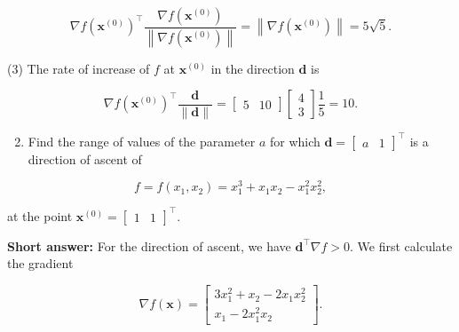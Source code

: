 \begin{equation*}
	\nabla f\left(\boldsymbol{x}^{(0)}\right)^{\top} \frac{\nabla f\left(\boldsymbol{x}^{(0)}\right)}{\left\|\nabla f\left(\boldsymbol{x}^{(0)}\right)\right\|}=\left\|\nabla f\left(\boldsymbol{x}^{(0)}\right)\right\|=5 \sqrt{5} .
\end{equation*}

(3) The rate of increase of \(f\) at \(\boldsymbol{x}^{(0)}\) in the direction \(\boldsymbol{d}\) is

\begin{equation*}
	\nabla f\left(\boldsymbol{x}^{(0)}\right)^{\top} \frac{\boldsymbol{d}}{\|\boldsymbol{d}\|}=\left[\begin{array}{ll}
		5 & 10
	\end{array}\right]\left[\begin{array}{l}
		4 \\
		3
	\end{array}\right] \frac{1}{5}=10 .
\end{equation*}

\bigskip
\noindent
\begin{enumerate}
	\setcounter{enumi}{1}
	\item Find the range of values of the parameter \(a\) for which \(\boldsymbol{d}=\left[\begin{array}{ll}a & 1\end{array}\right]^{\top}\) is a direction of ascent of
\end{enumerate}

\begin{equation*}
	f=f\left(x_{1}, x_{2}\right)=x_{1}^{3}+x_{1} x_{2}-x_{1}^{2} x_{2}^{2},
\end{equation*}

at the point \(\boldsymbol{x}^{(0)}=\left[\begin{array}{ll}1 & 1\end{array}\right]^{\top}\).


\textbf{Short answer:}
For the direction of ascent, we have \(\boldsymbol{d}^{\top} \nabla f>0\). We first calculate the gradient

\begin{equation*}
	\nabla f(\boldsymbol{x})=\left[\begin{array}{c}
		3 x_{1}^{2}+x_{2}-2 x_{1} x_{2}^{2} \\
		x_{1}-2 x_{1}^{2} x_{2}
	\end{array}\right] .
\end{equation*}


